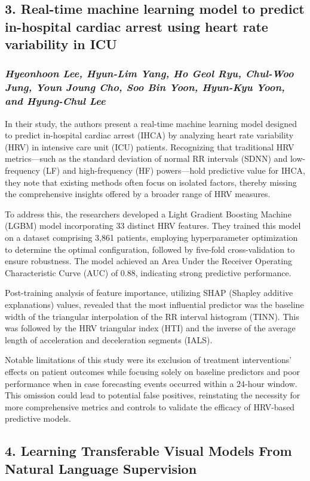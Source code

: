 \documentclass[letterpaper,12pt]{article}
\begin{document}
\newpage
\subsection*{3. Real-time machine learning model to predict in-hospital cardiac arrest using heart rate variability in ICU}
\subsubsection*{\textbf{\textit{Hyeonhoon Lee, Hyun-Lim Yang, Ho Geol Ryu, Chul-Woo Jung, Youn Joung Cho, Soo Bin Yoon, Hyun-Kyu Yoon, and Hyung-Chul Lee}}}
In their study, the authors present a real-time machine learning model designed to predict in-hospital cardiac arrest (IHCA) by analyzing heart rate variability (HRV) in intensive care unit (ICU) patients. Recognizing that traditional HRV metrics—such as the standard deviation of normal RR intervals (SDNN) and low-frequency (LF) and high-frequency (HF) powers—hold predictive value for IHCA, they note that existing methods often focus on isolated factors, thereby missing the comprehensive insights offered by a broader range of HRV measures.

To address this, the researchers developed a Light Gradient Boosting Machine
(LGBM) model incorporating 33 distinct HRV features. They trained this model on
a dataset comprising 3,861 patients, employing hyperparameter optimization to
determine the optimal configuration, followed by five-fold cross-validation to
ensure robustness. The model achieved an Area Under the Receiver Operating
Characteristic Curve (AUC) of 0.88, indicating strong predictive performance.

Post-training analysis of feature importance, utilizing SHAP (Shapley additive
explanations) values, revealed that the most influential predictor was the
baseline width of the triangular interpolation of the RR interval histogram
(TINN). This was followed by the HRV triangular index (HTI) and the inverse of
the average length of acceleration and deceleration segments (IALS).

Notable limitations of this study were its exclusion of treatment
interventions’ effects on patient outcomes while focusing solely on baseline
predictors and poor performance when in case forecasting events occurred within
a 24-hour window. This omission could lead to potential false positives,
reinstating the necessity for more comprehensive metrics and controls to
validate the efficacy of HRV-based predictive models.

\newpage
\subsection*{4. Learning Transferable Visual Models From Natural Language Supervision}
\end{document}
